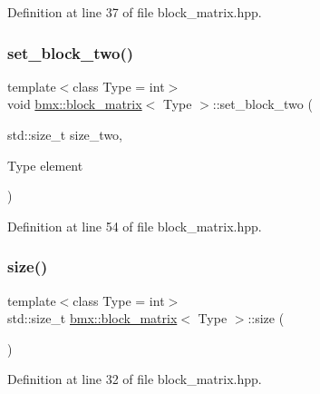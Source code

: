 Definition at line 37 of file block\+\_\+matrix.\+hpp.

\mbox{\label{classbmx_1_1block__matrix_a1233de84f6828b5b3dd80af76c0688bd}} 
\subsubsection{\texorpdfstring{set\+\_\+block\+\_\+two()}{set\_block\_two()}}
{\footnotesize\ttfamily template$<$class Type = int$>$ \\
void \mbox{\hyperlink{classbmx_1_1block__matrix}{bmx\+::block\+\_\+matrix}}$<$ Type $>$\+::set\+\_\+block\+\_\+two (\begin{DoxyParamCaption}\item[{std\+::size\+\_\+t}]{size\+\_\+two,  }\item[{Type}]{element }\end{DoxyParamCaption})\hspace{0.3cm}{\ttfamily [inline]}}



Definition at line 54 of file block\+\_\+matrix.\+hpp.

\mbox{\label{classbmx_1_1block__matrix_afe5002a570f6c7ae455add2ab3ad3c87}} 
\subsubsection{\texorpdfstring{size()}{size()}}
{\footnotesize\ttfamily template$<$class Type = int$>$ \\
std\+::size\+\_\+t \mbox{\hyperlink{classbmx_1_1block__matrix}{bmx\+::block\+\_\+matrix}}$<$ Type $>$\+::size (\begin{DoxyParamCaption}{ }\end{DoxyParamCaption})\hspace{0.3cm}{\ttfamily [inline]}}



Definition at line 32 of file block\+\_\+matrix.\+hpp.

\mbox{\label{classbmx_1_1block__matrix_aa6200f28e371684979facaf7494bd755}} 
